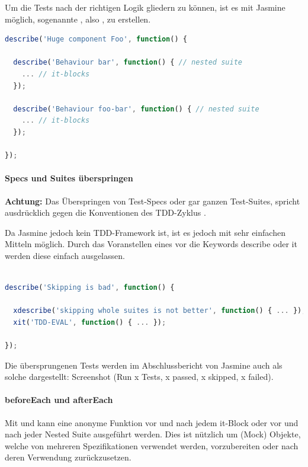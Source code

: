 Um die Tests nach der richtigen Logik gliedern zu können, ist es mit Jasmine möglich, sogenannte , also , zu erstellen.

\begin{lstlisting}[language=JavaScript]
describe('Huge component Foo', function() {

  describe('Behaviour bar', function() { // nested suite
    ... // it-blocks
  });

  describe('Behaviour foo-bar', function() { // nested suite
    ... // it-blocks
  });

});
\end{lstlisting}

\paragraph{Specs und Suites überspringen}
\textbf{Achtung:} Das Überspringen von Test-Specs oder gar ganzen Test-Suites, spricht ausdrücklich gegen die Konventionen des TDD-Zyklus \autocite{Beck:2003}.

Da Jasmine jedoch kein TDD-Framework ist, ist es jedoch mit sehr einfachen Mitteln möglich. Durch das Voranstellen eines  vor die Keywords describe oder it werden diese einfach ausgelassen.

\begin{lstlisting}[language=JavaScript]

describe('Skipping is bad', function() {

  xdescribe('skipping whole suites is not better', function() { ... });
  xit('TDD-EVAL', function() { ... });

});
\end{lstlisting}

Die übersprungenen Tests werden im Abschlussbericht von Jasmine auch als solche dargestellt:
Screenshot (Run x Tests, x passed, x skipped, x failed).

\paragraph{beforeEach und afterEach}

Mit  und  kann eine anonyme Funktion vor und nach jedem it-Block oder vor und nach jeder Nested Suite ausgeführt werden. Dies ist nützlich um (Mock) Objekte, welche von mehreren Spezifikationen verwendet werden, vorzubereiten oder nach deren Verwendung zurückzusetzen.

